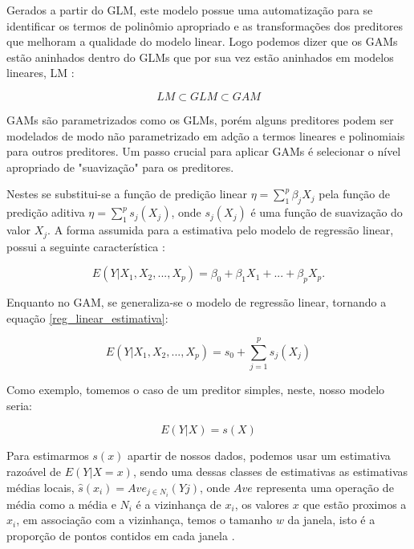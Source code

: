 \documentclass[
	12pt,				%
	openright,			%
	oneside,			%
	a4paper,			%
	english,			%
	brazil				%
	]{abntex2}
\begin{document}
Gerados a partir do GLM, este modelo possue uma automatização para se identificar os termos de polinômio apropriado
e as transformações dos preditores que melhoram a qualidade do modelo linear. Logo podemos dizer que os GAMs estão
aninhados dentro do GLMs que por sua vez estão aninhados em modelos lineares, LM \cite{GAMeGLM_especie_estudo}:

\begin{equation}
	LM \subset GLM \subset GAM
\end{equation}

GAMs são parametrizados como os GLMs, porém alguns preditores podem ser modelados de modo não parametrizado em 
adção a termos lineares e polinomiais para outros preditores. Um passo crucial para aplicar GAMs é selecionar
o nível apropriado de "suavização" para os preditores.

Nestes se substitui-se a função de predição linear $\eta = \sum_{1}^{p}\beta_jX_j$ pela função de predição aditiva 
$\eta = \sum_{1}^{p}s_j(X_j)$, onde $s_j(X_j)$ é uma função de suavização do valor $X_j$. A forma assumida
para a estimativa pelo modelo de regressão linear, possui a seguinte característica \cite{GAM}:

\begin{equation}
	\label{reg_linear_estimativa}
	E(Y|X_1,X_2,...,X_p) = \beta_0 + \beta_1X_1 + ... + \beta_pX_p.
\end{equation}

Enquanto no GAM, se generaliza-se o modelo de regressão linear, tornando a equação \ref{reg_linear_estimativa}:

\begin{equation}
	\label{reg_linear_generalizada}
	E(Y|X_1,X_2,...,X_p) = s_0 + \sum_{j=1}^{p} s_j(X_j)
\end{equation}

Como exemplo, tomemos o caso de um preditor simples, neste, nosso modelo seria:

\begin{equation}
	\label{preditor_simples}
	E(Y|X) = s(X)
\end{equation}

Para estimarmos $s(x)$ apartir de nossos dados, podemos usar um estimativa razoável de $E(Y|X=x)$, sendo uma dessas 
classes de estimativas as estimativas médias locais, $\hat{s}(x_i) = Ave_{j \in N_i}(Yj)$, onde $Ave$ representa uma
operação de média como a média e $N_i$ é a vizinhança de $x_i$, os valores $x$ que estão proximos a $x_i$, em
associação com a vizinhança, temos o tamanho $w$ da janela, isto é a proporção de pontos contidos em cada janela \cite{GAM}.
\end{document}
